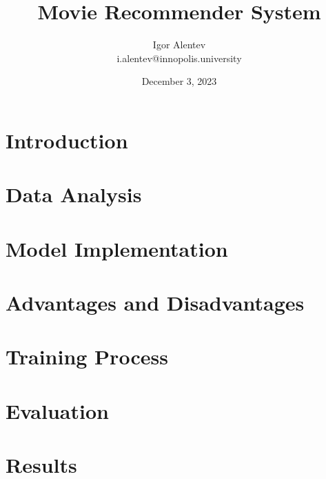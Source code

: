 \documentclass{article}
\title{Movie Recommender System}
\author{Igor Alentev \\ i.alentev@innopolis.university}
\date{December 3, 2023}
\begin{document}
\maketitle

\newpage

\begin{multicols}{2}

    \section{Introduction}

    \section{Data Analysis}

    \section{Model Implementation}

    \section{Advantages and Disadvantages}

    \section{Training Process}

    \section{Evaluation}

    \section{Results}

\end{multicols}
\end{document}
